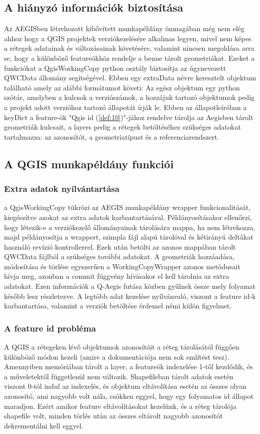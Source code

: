 \subsection{A  hiányzó információk biztosítása}
Az AEGISben létrehozott kibővített munkapéldány önmagában még nem elég ahhoz hogy a QGIS projektek verziókezelésére alkalmas legyen, mivel nem képes a rétegek adatainak és változásainak követésére, valamint nincsen megoldása arra se, hogy a különböző featureökhöz rendelje a benne tárolt geometriákat. Ezeket a funkciókat a QgisWorkingCopy python osztály biztosítja az úgynevezett QWCData állomány segítségével. Ebben egy extraData névre keresztelt objektum található amely az alábbi formátumot követi:
Az egész objektum egy python szótár, amelyben a kulcsok a verziószámok, a hozzájuk tartozó objektumok pedig a projekt adott verzióhoz tartozó állapotát írják le. Ebben az állapotleíróban a keyDict a feature-ök "Qgis id (\ref{def:10})"-jához rendelve tárolja az Aegisben tárolt geometriák kulcsait, a layers pedig a rétegek betöltéséhez szükséges adatokat tartalmazza: az azonosítót, a geometriatípust és a referenciarendszert.
\subsection{A QGIS munkapéldány funkciói}
\subsubsection{Extra adatok nyílvántartása}
a QgisWorkingCopy tükrözi az AEGIS munkapéldány wrapper funkcionalitását, kiegészítve azokat az extra adatok karbantartásával. Példányosításakor ellenőrzi, hogy létezik-e a verziókezelő állományainak tárolására mappa, ha nem létrehozza, majd példányosítja a wrappert, szimpla fájl alapú tárolóval és kétirányú deltákat használó revízió kontrollerrel. Ezek után betölti az azonos mappában tárolt QWCData fájlból a szükséges további adatokat.
A geometriák hozzáadása, módosítása és törlése egyszerűen a WorkingCopyWrapper azonos metódusait hívja meg, azonban a commit függvény hívásakor el kell tárolnia az extra adatokat. Ezen információk a Q-Aegis futása közben gyűlnek össze mely folyamat később lesz részletezve. A legtöbb adat kezelése nyílvánvaló, viszont a feature id-k karbantartása, valamint a verziók betöltése érdemel némi külön figyelmet.
\subsubsection{A feature id probléma}
A QGIS a rétegeken lévő objektumok azonosítóit a réteg tárolásától függően különböző módon kezeli (amire a dokumentációja nem sok említést tesz). Amennyiben memóriában tárolt a layer, a featureök indexelése 1-től kezdődik, és a műveletektől függetlenül nem változik. Shapefileban tárolt adatok esetén viszont 0-tól indul az indexelés, és objektum eltávolítása esetén az összes olyan azonosító, ami nagyobb volt nála, csökken eggyel, hogy egy folyamatos id állapot maradjon. Ezért amikor feature eltávolításokat kezelünk, és a réteg tárolója shapefile volt, minden törlés után az összes eltárolt nagyobb azonosítót dekrementálni kell eggyel.
